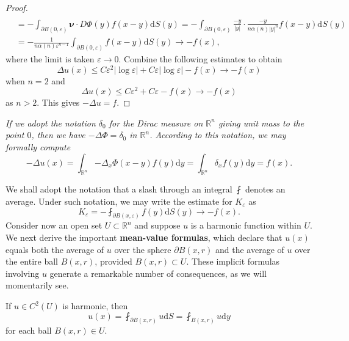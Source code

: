 \begin{proof}
$$\begin{aligned}
\\
&=-\int_{\partial B\left( 0,\varepsilon \right)}{\mathbf{\nu }\cdot D\Phi \left( y \right) f\left( x-y \right) \mathrm{d}S\left( y \right)}=-\int_{\partial B\left( 0,\varepsilon \right)}{\frac{-y}{\left| y \right|}\cdot \frac{-y}{n\alpha \left( n \right) \left| y \right|^n}f\left( x-y \right) \mathrm{d}S\left( y \right)}
\\
&=-\frac{1}{n\alpha \left( n \right) \varepsilon ^{n-1}}\int_{\partial B\left( 0,\varepsilon \right)}{f\left( x-y \right) \mathrm{d}S\left( y \right)}\rightarrow -f\left( x \right) ,
\end{aligned}
$$
where the limit is taken $\varepsilon\to 0$. Combine the following estimates to obtain 
$$
\Delta u\left( x \right) \le C\varepsilon ^2\left| \log \varepsilon \right|+C\varepsilon \left| \log \varepsilon \right|-f\left( x \right) \rightarrow -f\left( x \right) 
$$
when $n=2$ and 
$$
\Delta u\left( x \right) \le C\varepsilon ^2+C\varepsilon -f\left( x \right) \rightarrow -f\left( x \right) 
$$
as $n>2$. This gives $-\Delta u=f$.
\end{proof}
\begin{note}\em
If we adopt the notation $\delta_0$ for the Dirac measure on $\mathbb{R}^n$ giving unit mass to the point $0$, then we have $-\Delta\Phi=\delta_0$ in $\mathbb{R}^n$. According to this notation, we may formally compute 
$$
-\Delta u\left( x \right) =\int_{\mathbb{R} ^n}{-\Delta _x\Phi \left( x-y \right) f\left( y \right) \mathrm{d}y}=\int_{\mathbb{R} ^n}{\delta _xf\left( y \right) \mathrm{d}y}=f\left( x \right) .
$$
\end{note}
We shall adopt the notation that a slash through an integral $\fint$ denotes an average. Under such notation, we may write the estimate for $K_\varepsilon$ as 
$$
K_{\varepsilon}=-\fint_{\partial B\left( x,\varepsilon \right)}{f\left( y \right) \mathrm{d}S\left( y \right)}\rightarrow -f\left( x \right) .
$$
Consider now an open set $U\subset\mathbb{R}^n$ and suppose $u$ is a harmonic function within $U$. We next derive the important \textbf{mean-value formulas}, which declare that $u(x)$ equals both the average of $u$ over the sphere $\partial B(x,r)$ and the average of $u$ over the entire ball $B(x,r)$, provided $B(x,r)\subset U$. These implicit formulas involving $u$ generate a remarkable number of consequences, as we will momentarily see.
\begin{theorem}
If $u\in C^2(U)$ is harmonic, then 
$$
u\left( x \right) =\fint_{\partial B\left( x,r \right)}{u\mathrm{d}S}=\fint_{B\left( x,r \right)}{u\mathrm{d}y}
$$
for each ball $B(x,r)\in U$.
\end{theorem}
